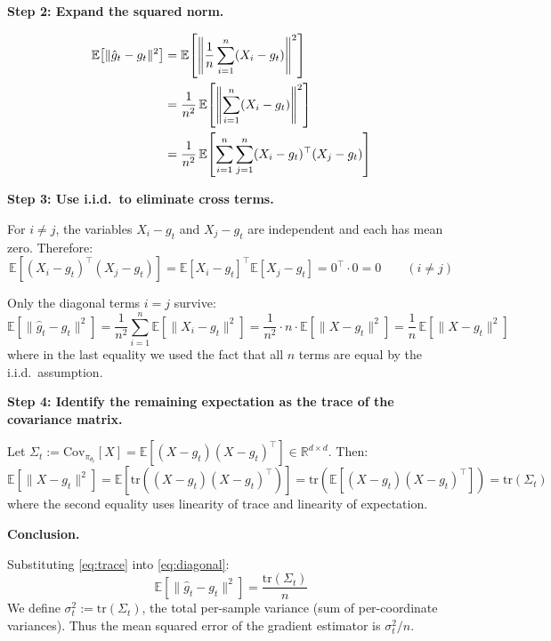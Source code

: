 \documentclass[11pt,a4paper]{article}
\newcommand{\E}{\mathbb{E}}
\newcommand{\ghat}{\hat{g}_t}
\newcommand{\gtrue}{g_t}
\newcommand{\pith}{\pi_{\theta_t}}
\begin{document}
\textbf{Step 2: Expand the squared norm.}

\begin{align}
  \E\!\left[\|\ghat - \gtrue\|^2\right]
  &= \E\!\left[\left\|\frac{1}{n}\sum_{i=1}^{n}(X_i - \gtrue)\right\|^2\right] \notag\\
  &= \frac{1}{n^2}\,\E\!\left[\left\|\sum_{i=1}^{n}(X_i - \gtrue)\right\|^2\right] \notag\\
  &= \frac{1}{n^2}\,\E\!\left[\sum_{i=1}^{n}\sum_{j=1}^{n}
       (X_i - \gtrue)^\top(X_j - \gtrue)\right]
  \label{eq:expand}
\end{align}

\textbf{Step 3: Use i.i.d.\ to eliminate cross terms.}

For $i \neq j$, the variables $X_i - \gtrue$ and $X_j - \gtrue$ are independent and each has mean zero.
Therefore:
\begin{equation}
  \E\!\left[(X_i - \gtrue)^\top(X_j - \gtrue)\right]
  = \E\!\left[X_i - \gtrue\right]^\top \E\!\left[X_j - \gtrue\right]
  = 0^\top \cdot 0 = 0
  \qquad (i \neq j)
  \label{eq:cross-zero}
\end{equation}

Only the diagonal terms $i = j$ survive:
\begin{equation}
  \E\!\left[\|\ghat - \gtrue\|^2\right]
  = \frac{1}{n^2}\sum_{i=1}^{n}\E\!\left[\|X_i - \gtrue\|^2\right]
  = \frac{1}{n^2}\cdot n\cdot\E\!\left[\|X - \gtrue\|^2\right]
  = \frac{1}{n}\,\E\!\left[\|X - \gtrue\|^2\right]
  \label{eq:diagonal}
\end{equation}
where in the last equality we used the fact that all $n$ terms are equal by the i.i.d.\ assumption.

\textbf{Step 4: Identify the remaining expectation as the trace of the covariance matrix.}

Let $\Sigma_t := \mathrm{Cov}_{\pith}[X] = \E\!\left[(X - \gtrue)(X-\gtrue)^\top\right] \in \mathbb{R}^{d\times d}$.
Then:
\begin{equation}
  \E\!\left[\|X - \gtrue\|^2\right]
  = \E\!\left[\mathrm{tr}\!\left((X-\gtrue)(X-\gtrue)^\top\right)\right]
  = \mathrm{tr}\!\left(\E\!\left[(X-\gtrue)(X-\gtrue)^\top\right]\right)
  = \mathrm{tr}(\Sigma_t)
  \label{eq:trace}
\end{equation}
where the second equality uses linearity of trace and linearity of expectation.

\textbf{Conclusion.}

Substituting \eqref{eq:trace} into \eqref{eq:diagonal}:
\begin{equation}
  \boxed{
  \E\!\left[\|\ghat - \gtrue\|^2\right]
  = \frac{\mathrm{tr}(\Sigma_t)}{n}
  }
  \label{eq:mse}
\end{equation}
We define $\sigma_t^2 := \mathrm{tr}(\Sigma_t)$, the total per-sample variance (sum of per-coordinate variances).
Thus the mean squared error of the gradient estimator is $\sigma_t^2 / n$.
\end{document}
